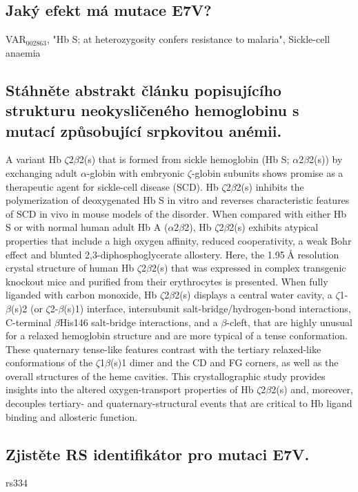 \documentclass[11pt]{article}
\begin{document}
\subsection{Jaký efekt má mutace E7V?}
\label{sec:orgb061b27}
VAR\(_{\text{002863}}\), "Hb S; at heterozygosity confers resistance to malaria", Sickle-cell anaemia
\subsection{Stáhněte abstrakt článku popisujícího strukturu neokysličeného hemoglobinu s mutací způsobující srpkovitou anémii.}
\label{sec:orgc75c0b8}
A variant Hb \(\zeta\)2\(\beta\)2(s) that is formed from sickle hemoglobin (Hb S; \(\alpha\)2\(\beta\)2(s)) by exchanging adult \(\alpha\)-globin with embryonic \(\zeta\)-globin subunits shows promise as a therapeutic agent for sickle-cell disease (SCD). Hb \(\zeta\)2\(\beta\)2(s) inhibits the polymerization of deoxygenated Hb S in vitro and reverses characteristic features of SCD in vivo in mouse models of the disorder. When compared with either Hb S or with normal human adult Hb A (\(\alpha\)2\(\beta\)2), Hb \(\zeta\)2\(\beta\)2(s) exhibits atypical properties that include a high oxygen affinity, reduced cooperativity, a weak Bohr effect and blunted 2,3-diphosphoglycerate allostery. Here, the 1.95 Å resolution crystal structure of human Hb \(\zeta\)2\(\beta\)2(s) that was expressed in complex transgenic knockout mice and purified from their erythrocytes is presented. When fully liganded with carbon monoxide, Hb \(\zeta\)2\(\beta\)2(s) displays a central water cavity, a \(\zeta\)1-\(\beta\)(s)2 (or \(\zeta\)2-\(\beta\)(s)1) interface, intersubunit salt-bridge/hydrogen-bond interactions, C-terminal \(\beta\)His146 salt-bridge interactions, and a \(\beta\)-cleft, that are highly unusual for a relaxed hemoglobin structure and are more typical of a tense conformation. These quaternary tense-like features contrast with the tertiary relaxed-like conformations of the \(\zeta\)1\(\beta\)(s)1 dimer and the CD and FG corners, as well as the overall structures of the heme cavities. This crystallographic study provides insights into the altered oxygen-transport properties of Hb \(\zeta\)2\(\beta\)2(s) and, moreover, decouples tertiary- and quaternary-structural events that are critical to Hb ligand binding and allosteric function.
\subsection{Zjistěte RS identifikátor pro mutaci E7V.}
\label{sec:org3b50a0b}
rs334
\end{document}
